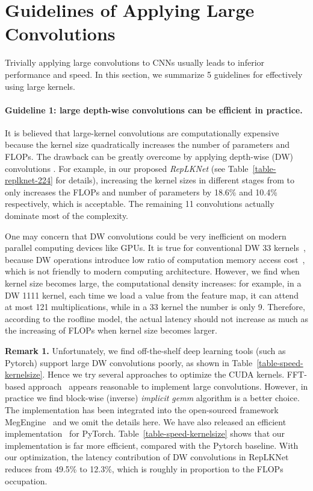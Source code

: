 \documentclass[10pt,twocolumn,letterpaper]{article}
\begin{document}
	
	\section{Guidelines of Applying Large Convolutions}\label{sect-3}
	
	Trivially applying large convolutions to CNNs usually leads to inferior performance and speed. In this section, we summarize 5 guidelines for effectively using large kernels.
	
	\vspace{-0.15in}\paragraph{Guideline 1: large depth-wise convolutions can be efficient in practice.} 
	It is believed that large-kernel convolutions are computationally expensive because the kernel size quadratically increases the number of parameters and FLOPs. The drawback can be greatly overcome by applying depth-wise (DW) convolutions \cite{mbv1,chollet2017xception}. For example, in our proposed \emph{RepLKNet} (see Table~\ref{table-replknet-224} for details), increasing the kernel sizes in different stages from  to  only increases the FLOPs and number of parameters by 18.6\% and 10.4\% respectively, which is acceptable. The remaining 11 convolutions actually dominate most of the complexity. 
	
	One may concern that DW convolutions could be very inefficient on modern parallel computing devices like GPUs. It is true for conventional DW 33 kernels~\cite{mbv1,mbv2,zhang2018shufflenet}, because DW operations introduce low ratio of computation \vs memory access cost~\cite{ma2018shufflenet}, which is not friendly to modern computing architecture. However, we find when kernel size becomes large, the computational density increases: for example, in a DW 1111 kernel, each time we load a value from the feature map, it can attend at most 121 multiplications, while in a 33 kernel the number is only 9. Therefore, according to the roofline model, the actual latency should not increase as much as the increasing of FLOPs when kernel size becomes larger. 
	
	\noindent \textbf{Remark 1.} Unfortunately, we find off-the-shelf deep learning tools (such as Pytorch) support large DW convolutions poorly, as shown in Table~\ref{table-speed-kernelsize}. Hence we try several approaches to optimize the CUDA kernels. FFT-based approach~\cite{mathieu2013fast} appears reasonable to implement large convolutions. However, in practice we find block-wise (inverse) \emph{implicit gemm} algorithm is a better choice. The implementation has been integrated into the open-sourced framework MegEngine~\cite{MegEngine} and we omit the details here. We have also released an efficient implementation~\cite{RepLKNet-pytorch} for PyTorch. Table~\ref{table-speed-kernelsize} shows that our implementation is far more efficient, compared with the Pytorch baseline. With our optimization, the latency contribution of DW convolutions in RepLKNet reduces from 49.5\% to 12.3\%, which is roughly in proportion to the FLOPs occupation. 
	
\end{document}
